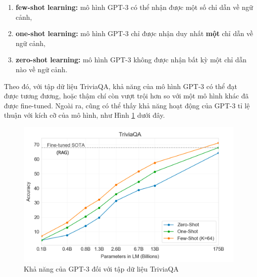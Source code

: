 \begin{enumerate}
    \item \textbf{few-shot learning:} mô hình GPT-3 có thể nhận được một số chỉ dẫn về ngữ cảnh,
    \item \textbf{one-shot learning:} mô hình GPT-3 chỉ được nhận duy nhất \textbf{một} chỉ dẫn về ngữ cảnh,
    \item \textbf{zero-shot learning:} mô hình GPT-3 không được nhận bất kỳ một chỉ dẫn nào về ngữ cảnh.
\end{enumerate}

Theo đó, với tập dữ liệu TriviaQA, khả năng của mô hình GPT-3 có thể đạt được tương đương, hoặc thậm chí còn vượt trội hơn so với một mô hình khác đã được fine-tuned. Ngoài ra, cũng có thể thấy khả năng hoạt động của GPT-3 tỉ lệ thuận với kích cỡ của mô hình, như Hình \ref{fig:arch_gpt3} dưới đây.

\begin{figure}[h!]
    \centering
    \includegraphics[width=\linewidth]{img/arch/GPT3-triviaqa.png}
    \caption{Khả năng của GPT-3 đối với tập dữ liệu TriviaQA}
    \label{fig:arch_gpt3}
\end{figure}